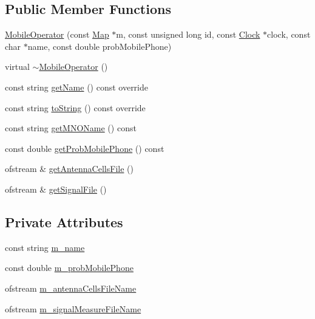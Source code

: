 \subsection*{Public Member Functions}
\begin{DoxyCompactItemize}
\item 
\hyperlink{class_mobile_operator_a8a8ad5fccedc56a31118f248f2aa332f}{Mobile\+Operator} (const \hyperlink{class_map}{Map} $\ast$m, const unsigned long id, const \hyperlink{class_clock}{Clock} $\ast$clock, const char $\ast$name, const double prob\+Mobile\+Phone)
\item 
virtual \hyperlink{class_mobile_operator_af77920475ff630755355f67b8f5f2708}{$\sim$\+Mobile\+Operator} ()
\item 
const string \hyperlink{class_mobile_operator_a2b4538d96f7aa898e6e470411d40cbf7}{get\+Name} () const override
\item 
const string \hyperlink{class_mobile_operator_aa83724a149499ef10678ad651a5b40df}{to\+String} () const override
\item 
const string \hyperlink{class_mobile_operator_a003a5d91f543eaf5ff11894bd462ac77}{get\+M\+N\+O\+Name} () const
\item 
const double \hyperlink{class_mobile_operator_afe59edb4ba22cea7fab968fdd1e2ce31}{get\+Prob\+Mobile\+Phone} () const
\item 
ofstream \& \hyperlink{class_mobile_operator_ae6aa3043d946fa97eba7032b9707e52a}{get\+Antenna\+Cells\+File} ()
\item 
ofstream \& \hyperlink{class_mobile_operator_ac39217182fd0ce7ef5da3b9018bcb965}{get\+Signal\+File} ()
\end{DoxyCompactItemize}
\subsection*{Private Attributes}
\begin{DoxyCompactItemize}
\item 
const string \hyperlink{class_mobile_operator_adc9bb6e834adbaf7f85ad7cf9e4c9bec}{m\+\_\+name}
\item 
const double \hyperlink{class_mobile_operator_a4061b50b15ec5499d57ef0e85687c1a2}{m\+\_\+prob\+Mobile\+Phone}
\item 
ofstream \hyperlink{class_mobile_operator_abd11e27d3ed1273be761a55da1549fa4}{m\+\_\+antenna\+Cells\+File\+Name}
\item 
ofstream \hyperlink{class_mobile_operator_af9c02c4088656c0f21ecc93b7023e776}{m\+\_\+signal\+Measure\+File\+Name}
\end{DoxyCompactItemize}


